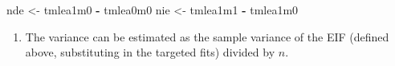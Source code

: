\documentclass[
  12pt, krantz2,
]{book}
\makeatletter
\newenvironment{Shaded}{\begin{snugshade}}{\end{snugshade}}
\newcommand{\NormalTok}[1]{#1}
\newcommand{\OperatorTok}[1]{\textcolor[rgb]{0.81,0.36,0.00}{\textbf{#1}}}
\newcommand{\StringTok}[1]{\textcolor[rgb]{0.31,0.60,0.02}{#1}}
\providecommand{\tightlist}{%
  \setlength{\itemsep}{0pt}\setlength{\parskip}{0pt}}
\newenvironment{kframe}{%
\medskip{}
\setlength{\fboxsep}{.8em}
 \def\at@end@of@kframe{}%
 \ifinner\ifhmode%
  \def\at@end@of@kframe{\end{minipage}}%
  \begin{minipage}{\columnwidth}%
 \fi\fi%
 \def\FrameCommand##1{\hskip\@totalleftmargin \hskip-\fboxsep
 \colorbox{shadecolor}{##1}\hskip-\fboxsep
     \hskip-\linewidth \hskip-\@totalleftmargin \hskip\columnwidth}%
 \MakeFramed {\advance\hsize-\width
   \@totalleftmargin\z@ \linewidth\hsize
   \@setminipage}}%
 {\par\unskip\endMakeFramed%
 \at@end@of@kframe}
\renewenvironment{Shaded}{\begin{kframe}}{\end{kframe}}
\theoremstyle{definition}
\theoremstyle{definition}
\theoremstyle{definition}
\newcommand{\1}{\mathbbm{1}}
\makeatother
\begin{document}
\begin{Shaded}
\begin{Highlighting}[]
\NormalTok{nde <-}\StringTok{ }\NormalTok{tmlea1m0 }\OperatorTok{-}\StringTok{ }\NormalTok{tmlea0m0}
\NormalTok{nie <-}\StringTok{ }\NormalTok{tmlea1m1 }\OperatorTok{-}\StringTok{ }\NormalTok{tmlea1m0}
\end{Highlighting}
\end{Shaded}

\begin{enumerate}
\def\labelenumi{\arabic{enumi}.}
\setcounter{enumi}{12}
\tightlist
\item
  The variance can be estimated as the sample variance of the EIF (defined
  above, substituting in the targeted fits) divided by \(n\).
\end{enumerate}
\end{document}
